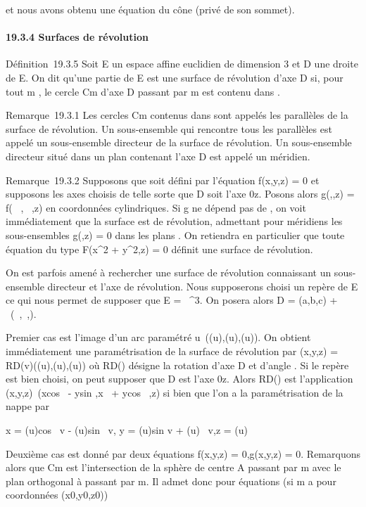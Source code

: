 et nous avons obtenu une équation du cône (privé de son sommet).

\paragraph{19.3.4 Surfaces de révolution}

Définition~19.3.5 Soit E un espace affine euclidien de dimension 3 et D
une droite de E. On dit qu'une partie \Sigma de E est une surface de
révolution d'axe D si, pour tout m \in \Sigma, le cercle Cm d'axe D
passant par m est contenu dans \Sigma.

Remarque~19.3.1 Les cercles Cm contenus dans \Sigma sont appelés
les parallèles de la surface de révolution. Un sous-ensemble qui
rencontre tous les parallèles est appelé un sous-ensemble directeur de
la surface de révolution. Un sous-ensemble directeur situé dans un plan
contenant l'axe D est appelé un méridien.

Remarque~19.3.2 Supposons que \Sigma soit défini par l'équation f(x,y,z) = 0
et supposons les axes choisis de telle sorte que D soit l'axe 0z. Posons
alors g(\rho,\theta,z) = f(\rhocos~
\theta,\rhosin~ \theta,z) en coordonnées cylindriques. Si g
ne dépend pas de \theta, on voit immédiatement que la surface est de
révolution, admettant pour méridiens les sous-ensembles g(\rho,z) = 0 dans
les plans \rhoOz. On retiendra en particulier que toute équation du type
F(x^2 + y^2,z) = 0 définit une surface de
révolution.

On est parfois amené à rechercher une surface de révolution connaissant
un sous-ensemble directeur \Gamma et l'axe de révolution. Nous supposerons
choisi un repère de E ce qui nous permet de supposer que E =
~^3. On posera alors D = (a,b,c) + ~(\alpha~,\beta~,\gamma).

Premier cas \Gamma est l'image d'un arc paramétré
u\mapsto~(\phi(u),\psi(u),\omega(u)). On obtient immédiatement
une paramétrisation de la surface de révolution par (x,y,z) =
RD(v)(\phi(u),\psi(u),\omega(u)) où RD(\theta) désigne la rotation
d'axe D et d'angle \theta. Si le repère est bien choisi, on peut supposer que
D est l'axe 0z. Alors RD(\theta) est l'application
(x,y,z)\mapsto~(xcos~ \theta -
ysin \theta,x\sin~ \theta +
ycos~ \theta,z) si bien que l'on a la
paramétrisation de la nappe par

x = \phi(u)cos~ v -
\psi(u)sin~ v, y =
\phi(u)sin v + \psi(u)\cos~
v,z = \omega(u)

Deuxième cas \Gamma est donné par deux équations f(x,y,z) = 0,g(x,y,z) = 0.
Remarquons alors que Cm est l'intersection de la sphère de
centre A passant par m avec le plan orthogonal à
\vecu passant par m. Il admet donc pour équations (si
m a pour coordonnées (x0,y0,z0))

